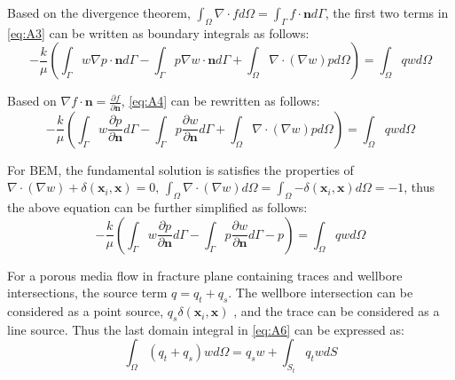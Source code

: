 \documentclass[num-refs]{wiley-networks}
\begin{document}
Based on the divergence theorem, $\int_{\Omega}{\nabla \cdot fd\Omega}=\int_{\Gamma}{f\cdot \mathbf{n}d\Gamma}$, the first two terms in \eqref{eq:A3} can be written as boundary integrals as follows:
\begin{equation}
    -\frac{k}{\mu}\left( \int_{\Gamma}{w\nabla p\cdot \mathbf{n} d\Gamma}-\int_{\Gamma}{p\nabla w\cdot \mathbf{n} d\Gamma}+\int_{\Omega}{\nabla \cdot \left( \nabla w \right) p d\Omega} \right) =\int_{\Omega}{q w d\Omega}
\label{eq:A4}
\end{equation}

Based on $\nabla f\cdot\mathbf{n}=\frac{\partial f}{\partial \mathbf{n}}$, \eqref{eq:A4} can be rewritten as follows:
\begin{equation}
    -\frac{k}{\mu}\left( \int_{\Gamma}{w\frac{\partial p}{\partial \mathbf{n}}d\Gamma}-\int_{\Gamma}{p\frac{\partial w}{\partial \mathbf{n}}d\Gamma}+\int_{\Omega}{\nabla \cdot \left( \nabla w \right) p d\Omega} \right) =\int_{\Omega}{qw d\Omega}
\label{eq:A5}
\end{equation}

For BEM, the fundamental solution is satisfies the properties of $\nabla \cdot \left( \nabla w \right) +\delta \left( \mathbf{x}_i,\mathbf{x} \right) =\text{0, }\int_{\Omega}{\nabla \cdot \left( \nabla w \right)d\Omega}=\int_{\Omega}{-\delta \left( \mathbf{x}_i,\mathbf{x} \right)d\Omega}=-1$, thus the above equation can be further simplified as follows:
\begin{equation}
    -\frac{k}{\mu}\left( \int_{\Gamma}{w\frac{\partial p}{\partial \mathbf{n}}d\Gamma}-\int_{\Gamma}{p\frac{\partial w}{\partial \mathbf{n}}d\Gamma}-p \right) =\int_{\Omega}{qw d\Omega}
\label{eq:A6}
\end{equation}

For a porous media flow in fracture plane containing traces and wellbore intersections, the source term $q=q_{t} + q_{s}$. The wellbore intersection can be considered as a point source, $q_s\delta \left( \mathbf{x}_i,\mathbf{x} \right) $ , and the trace can be considered as a line source. Thus the last domain integral in \eqref{eq:A6} can be expressed as:
\begin{equation}
    \int_{\Omega}{\left( q_t+q_s \right) wd\Omega}=q_sw+\int_{S_t}{q_twdS}
\label{eq:A7}
\end{equation}
\end{document}
